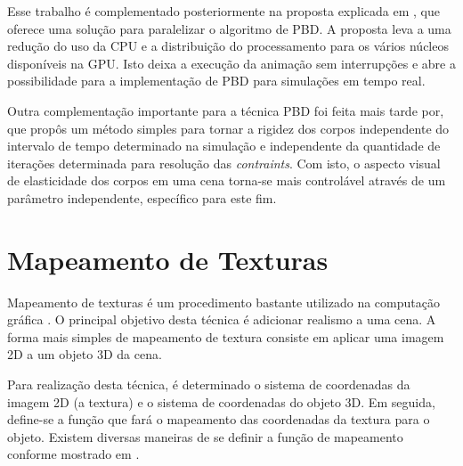 Esse trabalho é complementado posteriormente na proposta explicada em \cite{fratarcangeli2013gpu}, que oferece uma solução para paralelizar o algoritmo de \ac{PBD}. A proposta leva a uma redução do uso da \ac{CPU} e a distribuição do processamento para os vários núcleos disponíveis na \ac{GPU}. Isto deixa a execução da animação sem interrupções e abre a possibilidade para a implementação de \ac{PBD} para simulações em tempo real.

Outra complementação importante para a técnica \ac{PBD} foi feita mais tarde por\cite{macklin2016xpbd}, que propôs um método simples para tornar a rigidez dos corpos independente do intervalo de tempo determinado na simulação e independente da quantidade de iterações determinada para resolução das \textit{contraints}. Com isto, o aspecto visual de elasticidade dos corpos em uma cena torna-se mais controlável através de um parâmetro independente, específico para este fim.



\section{Mapeamento de Texturas}

Mapeamento de texturas é um procedimento bastante utilizado na computação gráfica \cite{haeberli1993texture}. O principal objetivo desta técnica é adicionar realismo a uma cena. A forma mais simples de mapeamento de textura consiste em aplicar uma imagem 2D a um objeto 3D da cena. \cite[Capítulo~6]{shreiner2013opengl}

Para realização desta técnica, é determinado o sistema de coordenadas da imagem 2D (a textura) e o sistema de coordenadas do objeto 3D. Em seguida, define-se a função que fará o mapeamento das coordenadas da textura para o objeto. Existem diversas maneiras de se definir a função de mapeamento conforme mostrado em \cite{hormann2007mesh}.


